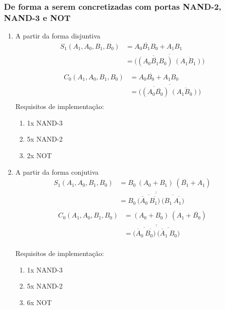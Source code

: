 \documentclass[a4paper,12pt]{article}
\begin{document}
\subsubsection{De forma a serem concretizadas com portas NAND-2, NAND-3 e NOT}
\begin{enumerate}
\item A partir da forma disjuntiva
\begin{equation}
\begin{split}
S_1(A_1,A_0,B_1,B_0) & = A_0\overline{B_1}B_0 + A_1B_1 \\
                     & = \overline{\overline{((A_0\overline{B_1}B_0)}
                         ~\overline {(A_1B_1))}}  \\  
\end{split}
\end{equation}
\begin{equation}
\begin{split}
C_0(A_1,A_0,B_1,B_0) & = A_0\overline{B_0} + A_1B_0 \\
                     & = \overline{\overline{((A_0 \overline{B_0})}
                         ~\overline{(A_1 B_0))}}  \\   
\end{split}
\end{equation}
Requisitos de implementação:
\begin{enumerate}
    \item 1x NAND-3
    \item 5x NAND-2
    \item 2x NOT
  \end{enumerate}
\item A partir da forma conjutiva
\begin{equation}
\begin{split}
S_1(A_1,A_0,B_1,B_0) & = B_0~(A_0+B_1)~(\overline{B_1}+A_1) \\
                     & = \overline{\overline{B_0~\overline{\overline{(A_0}~\overline{B_1)}}
                     ~\overline{(B_1~\overline{A_1)}}}} \\
\end{split}
\end{equation}
\begin{equation}
\begin{split}
C_0(A_1,A_0,B_1,B_0) & = (A_0+B_0)~(A_1+\overline{B_0}) \\
                     & = \overline{\overline{\overline{\overline{(A_0}~\overline{B_0)}}
                     ~\overline{\overline{(A_1}~B_0)}}} \\
\end{split}
\end{equation}

\pagebreak
Requisitos de implementação:
\begin{enumerate}
    \item 1x NAND-3
    \item 5x NAND-2
    \item 6x NOT
  \end{enumerate}
\end{enumerate}
\end{document}
